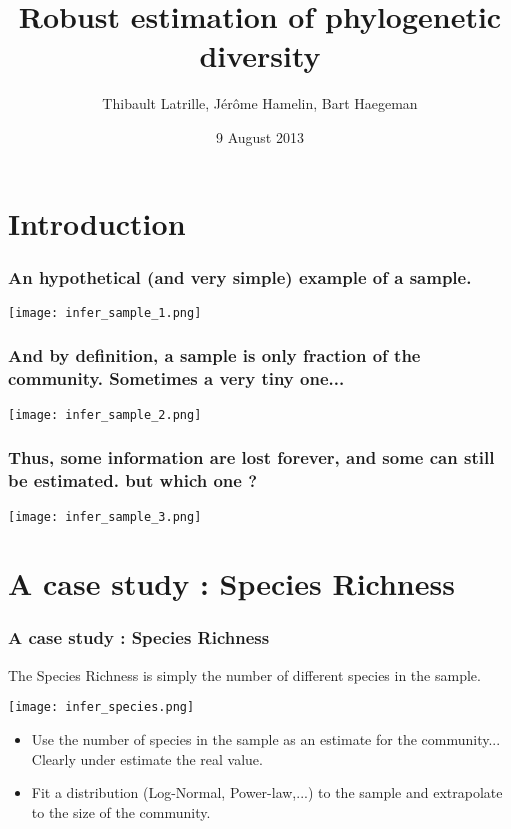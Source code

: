 \documentclass[10pt]{beamer}
\author{Thibault Latrille, Jérôme Hamelin, Bart Haegeman}
\title{Robust estimation of phylogenetic diversity}
\institute{Laboratoire de Biotechnologie de l'Environnement (LBE), INRA Narbonne}
\date{9 August 2013}
\begin{document}
\frame{\titlepage} 

\section{Introduction}

\frame{\tableofcontents}

\begin{frame}
\frametitle{An hypothetical (and very simple) example of a sample.}
	\begin{center}
       \texttt{[image: infer\_sample\_1.png]}
	\end{center}
\end{frame}

\begin{frame}
\frametitle{And by definition, a sample is only fraction of the community. Sometimes a very tiny one...}
	\begin{center}
       \texttt{[image: infer\_sample\_2.png]}
	\end{center}
\end{frame}

\begin{frame}
\frametitle{Thus, some information are lost forever, and some can still be estimated. but which one ?}
	\begin{center}
       \texttt{[image: infer\_sample\_3.png]}
	\end{center}
\end{frame}


\section{A case study : Species Richness}

\begin{frame}
\frametitle{A case study : Species Richness}
The Species Richness is simply the number of different species in the sample.

	\begin{center}
       \texttt{[image: infer\_species.png]}
	\end{center}
	
\begin{itemize}
\item Use the number of species in the sample as an estimate for the community... Clearly under estimate the real value.
\item Fit a distribution (Log-Normal, Power-law,...) to the sample and extrapolate to the size of the community. 
\end{itemize}
\end{frame}
\end{document}
